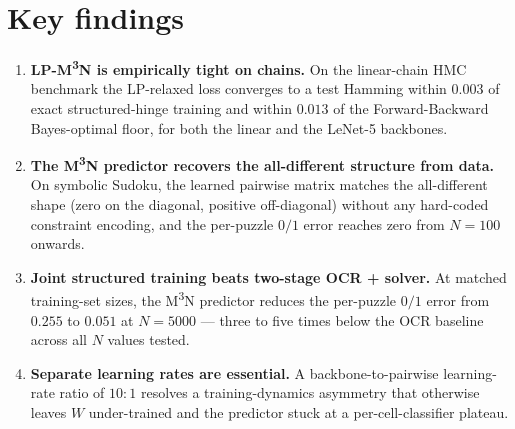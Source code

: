 \section{Key findings}
\label{sec:conclusion-findings}

\begin{enumerate}
    \item \textbf{LP-M\textsuperscript{3}N is empirically tight
    on chains.} On the linear-chain HMC benchmark the
    LP-relaxed loss converges to a test Hamming within $0.003$
    of exact structured-hinge training and within $0.013$ of
    the Forward-Backward Bayes-optimal floor, for both the
    linear and the LeNet-5 backbones.

    \item \textbf{The M\textsuperscript{3}N predictor recovers
    the all-different structure from data.} On symbolic Sudoku,
    the learned pairwise matrix matches the all-different shape
    (zero on the diagonal, positive off-diagonal) without any
    hard-coded constraint encoding, and the per-puzzle $0/1$
    error reaches zero from $N = 100$ onwards.

    \item \textbf{Joint structured training beats two-stage
    OCR + solver.} At matched training-set sizes, the
    M\textsuperscript{3}N predictor reduces the per-puzzle
    $0/1$ error from $0.255$ to $0.051$ at $N = 5000$ ---
    three to five times below the OCR baseline across all
    $N$ values tested.

    \item \textbf{Separate learning rates are essential.} A
    backbone-to-pairwise learning-rate ratio of $10\!:\!1$
    resolves a training-dynamics asymmetry that otherwise
    leaves $W$ under-trained and the predictor stuck at a
    per-cell-classifier plateau.
\end{enumerate}
